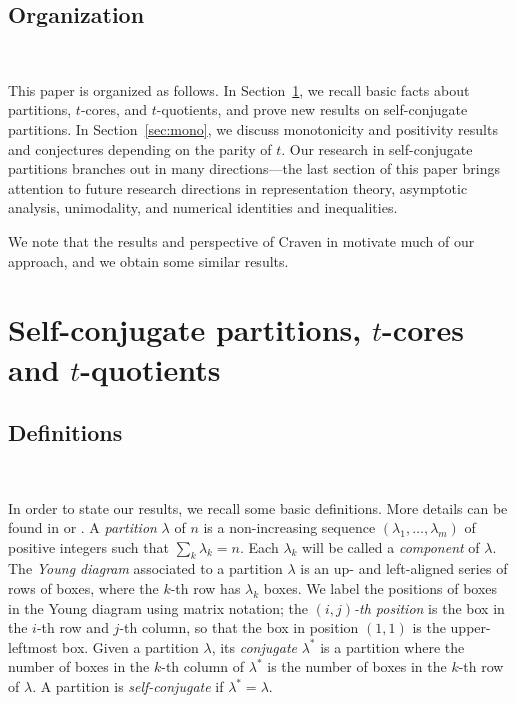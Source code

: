 \documentclass[12pt,leqno]{amsart}
\numberwithin{equation}{section}
\theoremstyle{definition}
\begin{document}
\subsection{Organization}\

This paper is organized as follows. In Section~\ref{sec:facts}, we recall basic facts about partitions, $t$-cores, and $t$-quotients, and prove new results on self-conjugate partitions. In Section~\ref{sec:mono}, we discuss monotonicity and positivity results and conjectures depending on the parity of $t$.  Our research in self-conjugate partitions branches out in many directions---the last section of this paper brings attention to future research directions in representation theory, asymptotic analysis, unimodality, and numerical identities and inequalities.

We note that the results and perspective of Craven in \cite{Craven} motivate much of our approach, and we obtain some similar results.

\section{Self-conjugate partitions, $t$-cores and $t$-quotients} \label{sec:facts}
\subsection{Definitions}\

In order to state our results, we recall some basic definitions. More details can be found in \cite[Sections 1--2]{Olsson1} or  \cite[Chapter 2]{JamesKerber}. A {\em partition} $\lambda$ of $n$ is a non-increasing sequence $(\lambda_1,\hdots,\lambda_m)$ of positive integers such that $\sum_k \lambda_k = n$. Each $\lambda_k$ will be called a {\em component} of $\lambda$. The {\em Young diagram} associated to a partition $\lambda$ is an up- and left-aligned series of rows of boxes, where the $k$-th row has $\lambda_k$ boxes. We label the positions of boxes in the Young diagram using matrix notation; the {\em $(i,j)$-th position} is the box in the $i$-th row and $j$-th column, so that the box in position $(1,1)$ is the upper-leftmost box.  Given a partition ${\lambda}$, its {\em conjugate} $\lambda^*$ is a partition where the number of boxes in the $k$-th column of ${\lambda}^*$ is the number of boxes in the $k$-th row of ${\lambda}$.  A partition is {\em self-conjugate} if $\lambda^*=\lambda$.
\end{document}

